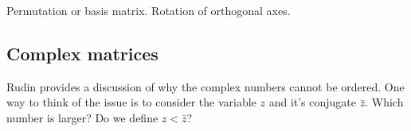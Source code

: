 Permutation or basis matrix. Rotation of orthogonal axes.

\subsection{Complex matrices}
Rudin provides a discussion of why the complex numbers cannot be ordered. One way to think of the issue is to consider the variable $z$ and it's conjugate $\bar{z}$. Which number is larger? Do we define $z<\bar{z}$?

\endinput